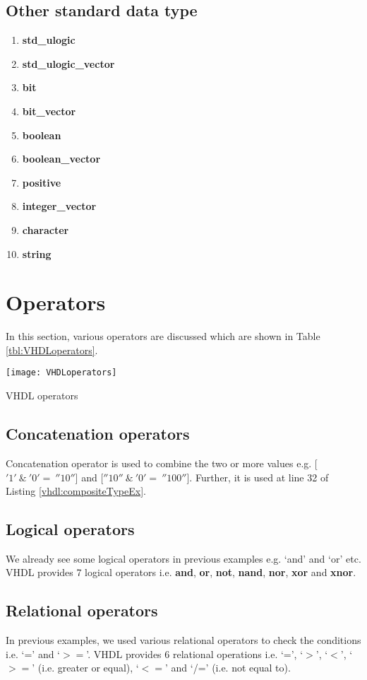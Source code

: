 \subsection{Other standard data type}
\begin{enumerate}
	\item \textbf{std\_ulogic}
	\item \textbf{std\_ulogic\_vector}
	\item \textbf{bit}
	\item \textbf{bit\_vector}
	\item \textbf{boolean}
	\item \textbf{boolean\_vector}
	\item \textbf{positive}
	\item \textbf{integer\_vector}
	\item \textbf{character}
	\item \textbf{string}
\end{enumerate}

\section{Operators}\label{sec:opearators}
In this section, various operators are discussed which are shown in Table \ref{tbl:VHDLoperators}. 

\begin{table}
	\centering
	\texttt{[image: VHDLoperators]}
	\caption{VHDL operators}
	\label{tbl:VHDLoperators}
\end{table}

\subsection*{Concatenation operators}
Concatenation operator is used to combine the two or more values e.g. [$'1'{ \ }\& { \ }'0' = { \ }''$$10''$] and [$''10''{ \ }\& { \ }'0' = { \ }''$$100''$]. Further, it is used at line 32 of Listing \ref{vhdl:compositeTypeEx}. 

\subsection*{Logical operators}
We already see some logical operators in previous examples e.g. `and' and `or' etc. VHDL provides 7 logical operators i.e. \textbf{and}, \textbf{or}, \textbf{not}, \textbf{nand}, \textbf{nor}, \textbf{xor} and \textbf{xnor}.

\subsection*{Relational operators}
In previous examples, we used various relational operators to check the conditions i.e. `=' and `$>=$'. VHDL provides 6 relational operations i.e. `=', `$>$', `$<$', `$>=$' (i.e. greater or equal), `$<=$' and `/=' (i.e. not equal to). 

